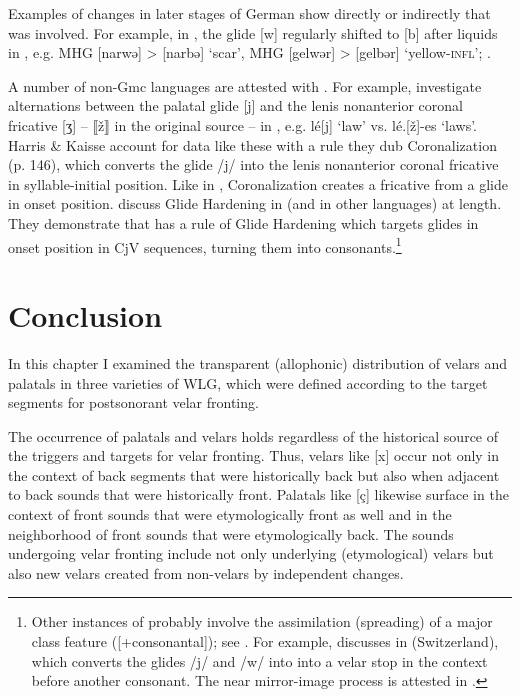 Examples of changes in later stages of German show directly or indirectly that  was involved. For example, in , the glide [w] regularly shifted to [b] after liquids in , e.g. MHG [narwə] >  [narbə] ‘scar’, MHG [gelwər] >  [gelbər] ‘yellow-\textsc{infl}’; \citet[368]{Schirmunski1962}.

A number of non-Gmc languages are attested with . For example, \citet{HarrisKaisse1999} investigate alternations between the palatal glide [j] and the lenis nonanterior coronal fricative [ʒ] -- ⟦ž⟧ in the original source -- in , e.g. lé[j] ‘law’ vs. lé.[ž]-es ‘laws’. Harris \& Kaisse account for data like these with a rule they dub Coronalization (p. 146), which converts the glide /j/ into the lenis nonanterior coronal fricative in syllable-initial position. Like  in , Coronalization creates a fricative from a glide in onset position. \citet{BaltazaniTopintzi2016} discuss Glide Hardening in  (and in other languages) at length. They demonstrate that  has a rule of Glide Hardening which targets glides in onset position in CjV sequences, turning them into consonants.\footnote{Other instances of  probably involve the assimilation (spreading) of a major class feature ([+consonantal]); see \citet{Kaisse1992}. For example, \citet{Kamprath1986} discusses  in  (Switzerland), which converts the glides /j/ and /w/ into into a velar stop in the context before another consonant. The near mirror-image process is attested in  \citep{Newton1972b}.}

\section{{Conclusion}}\label{sec:4.6}

In this chapter I examined the transparent (allophonic) distribution of velars and palatals in three varieties of WLG, which were defined according to the target segments for postsonorant velar fronting.

The occurrence of palatals and velars holds regardless of the historical source of the triggers and targets for velar fronting. Thus, velars like [x] occur not only in the context of back segments that were historically back but also when adjacent to back sounds that were historically front. Palatals like [ç] likewise surface in the context of front sounds that were etymologically front as well and in the neighborhood of front sounds that were etymologically back. The sounds undergoing velar fronting include not only underlying (etymological) velars but also new velars created from non-velars by independent changes.

